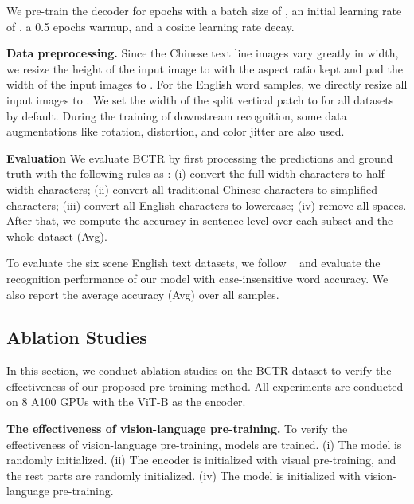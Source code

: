 We pre-train the decoder for  epochs with a batch size of , an initial learning rate of , a 0.5 epochs warmup, and a cosine learning rate decay. 

\vspace{2mm}
\noindent\textbf{Data preprocessing.}
Since the Chinese text line images vary greatly in width, we resize the height of the input image to  with the aspect ratio kept and pad the width of the input images to . For the English word samples, we directly resize all input images to .  We set the width of the split vertical patch to  for all datasets by default. During the training of downstream recognition, some data augmentations like rotation, distortion, and color jitter are also used.

\vspace{2mm}
\noindent\textbf{Evaluation} We evaluate BCTR by first processing the predictions and ground truth with the following rules as \cite{chenBCTR}: (i) convert the full-width characters to half-width characters; (ii) convert all traditional Chinese characters to simplified characters; (iii) convert all English characters to lowercase; (iv) remove all spaces. After that, we compute the accuracy in sentence level over each subset and the whole dataset (Avg).


To evaluate the six scene English text datasets, we follow ~\cite{shi2018aster,yu2020towards,ShanchengFang2021ReadLH,YuxinWang2021FromTT,XinyunZhang2022ContextbasedCL} and evaluate the recognition performance of our model with case-insensitive word accuracy. We also report the average accuracy (Avg) over all samples.



\subsection{Ablation Studies}
In this section, we conduct ablation studies on the BCTR dataset to verify the effectiveness of our proposed pre-training method. All experiments are conducted on 8 A100 GPUs with the ViT-B as the encoder.

\vspace{2mm}
\noindent\textbf{The effectiveness of vision-language pre-training.}
To verify the effectiveness of vision-language pre-training,  models are trained. (i) The model is randomly initialized. (ii) The encoder is initialized with visual pre-training, and the rest parts are randomly initialized.  (iv) The model is initialized with vision-language pre-training.


